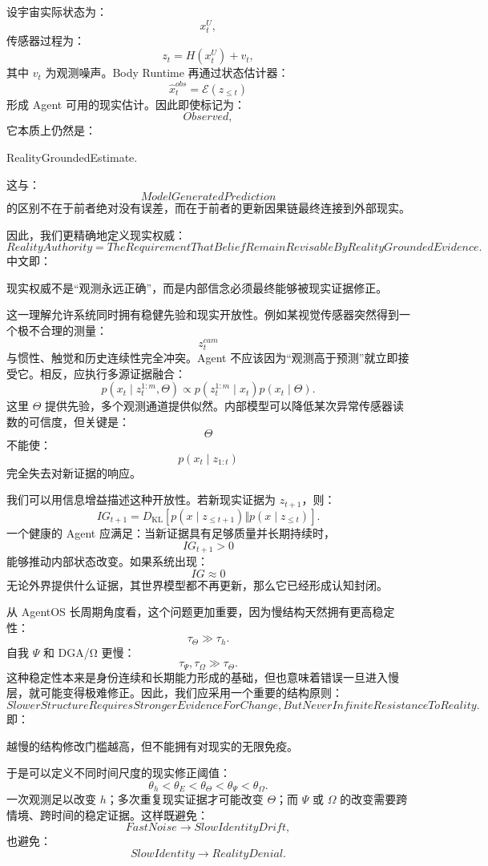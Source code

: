 设宇宙实际状态为：
\[
x_t^U,
\]
传感器过程为：
\[
z_t
=
H(x_t^U)+v_t,
\]
其中 $v_t$ 为观测噪声。Body Runtime 再通过状态估计器：
\[
\hat{x}^{obs}_t
=
\mathcal E(z_{\leq t})
\]
形成 Agent 可用的现实估计。因此即使标记为：
\[
Observed,
\]
它本质上仍然是：
\begin{statementbox}
RealityGroundedEstimate.
\end{statementbox}
这与：
\[
ModelGeneratedPrediction
\]
的区别不在于前者绝对没有误差，而在于前者的更新因果链最终连接到外部现实。

因此，我们更精确地定义现实权威：
\[
\boxed{
RealityAuthority
=
TheRequirementThatBeliefRemainRevisableByRealityGroundedEvidence.
}
\]
中文即：

\begin{statementbox}
现实权威不是“观测永远正确”，而是内部信念必须最终能够被现实证据修正。
\end{statementbox}

这一理解允许系统同时拥有稳健先验和现实开放性。例如某视觉传感器突然得到一个极不合理的测量：
\[
z_t^{cam}
\]
与惯性、触觉和历史连续性完全冲突。Agent 不应该因为``观测高于预测''就立即接受它。相反，应执行多源证据融合：
\[
p(x_t\mid z_t^{1:m},\Theta)
\propto
p(z_t^{1:m}\mid x_t)p(x_t\mid\Theta).
\]
这里 $\Theta$ 提供先验，多个观测通道提供似然。内部模型可以降低某次异常传感器读数的可信度，但关键是：
\[
\Theta
\]
不能使：
\[
p(x_t\mid z_{1:t})
\]
完全失去对新证据的响应。

我们可以用信息增益描述这种开放性。若新现实证据为 $z_{t+1}$，则：
\[
IG_{t+1}
=
D_{\mathrm{KL}}
\left[
p(x\mid z_{\leq t+1})
\Vert
p(x\mid z_{\leq t})
\right].
\]
一个健康的 Agent 应满足：当新证据具有足够质量并长期持续时，
\[
IG_{t+1}>0
\]
能够推动内部状态改变。如果系统出现：
\[
IG\approx0
\]
无论外界提供什么证据，其世界模型都不再更新，那么它已经形成认知封闭。

从 AgentOS 长周期角度看，这个问题更加重要，因为慢结构天然拥有更高稳定性：
\[
\tau_\Theta
\gg
\tau_h.
\]
自我 $\Psi$ 和 DGA/Ω 更慢：
\[
\tau_\Psi,\tau_\Omega
\gg
\tau_\Theta.
\]
这种稳定性本来是身份连续和长期能力形成的基础，但也意味着错误一旦进入慢层，就可能变得极难修正。因此，我们应采用一个重要的结构原则：
\[
\boxed{
SlowerStructureRequiresStrongerEvidenceForChange,
ButNeverInfiniteResistanceToReality.
}
\]
即：

\begin{statementbox}
越慢的结构修改门槛越高，但不能拥有对现实的无限免疫。
\end{statementbox}

于是可以定义不同时间尺度的现实修正阈值：
\[
\theta_h
<
\theta_E
<
\theta_\Theta
<
\theta_\Psi
<
\theta_\Omega.
\]
一次观测足以改变 $h$；多次重复现实证据才可能改变 $\Theta$；而 $\Psi$ 或 $\Omega$ 的改变需要跨情境、跨时间的稳定证据。这样既避免：
\[
FastNoise\rightarrow SlowIdentityDrift,
\]
也避免：
\[
SlowIdentity\rightarrow RealityDenial.
\]

